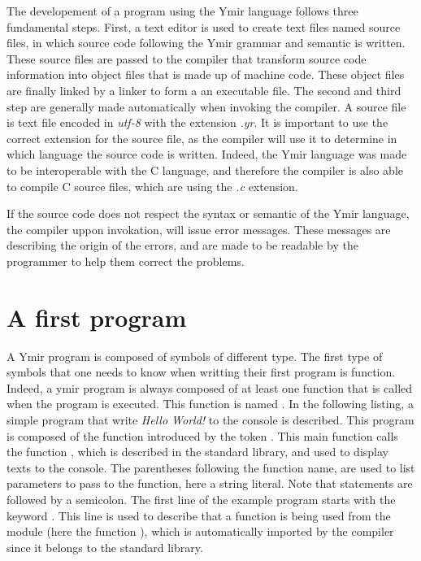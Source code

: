 The developement of a program using the Ymir language follows three fundamental
steps. First, a text editor is used to create text files named source files, in
which source code following the Ymir grammar and semantic is written. These
source files are passed to the compiler that transform source code information
into object files that is made up of machine code. These object files are
finally linked by a linker to form a an executable file. The second and third
step are generally made automatically when invoking the compiler. A source file
is text file encoded in \textit{utf-8} with the extension \textit{.yr}. It is
important to use the correct extension for the source file, as the compiler will
use it to determine in which language the source code is written. Indeed, the
Ymir language was made to be interoperable with the C language, and therefore
the compiler is also able to compile C source files, which are using
the \textit{.c} extension.

If the source code does not respect the syntax or semantic of the Ymir language,
the compiler uppon invokation, will issue error messages. These messages are
describing the origin of the errors, and are made to be readable by the
programmer to help them correct the problems.

\vspace{-20pt}%
\section{A first program}

A Ymir program is composed of symbols of different type. The first type of
symbols that one needs to know when writting their first program is function.
Indeed, a ymir program is always composed of at least one function that is
called when the program is executed. This function is named . In the
following listing, a simple program that write \textit{Hello World!} to the
console is described. This program is composed of the function 
introduced by the token . This main function calls the function
, which is described in the standard library, and used
to display texts to the console. The parentheses following the 
function name, are used to list parameters to pass to the function, here a
string literal. Note that statements are followed by a semicolon. The first line
of the example program starts with the keyword . This line is used to
describe that a function is being used from the  module (here the
function ), which is automatically imported by the compiler since
it belongs to the standard library.

